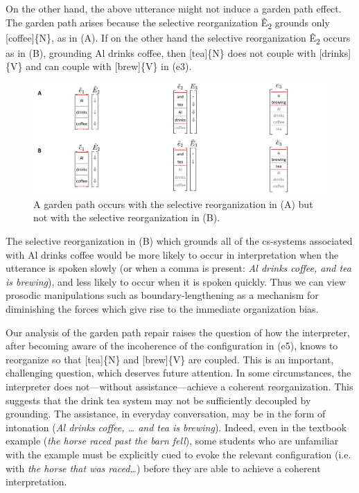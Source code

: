   On the other hand, the above utterance might not induce a garden path effect. The garden path arises because the selective reorganization Ê\textsubscript{2} grounds only [coffee]\{N\}, as in {}(A). If on the other hand the selective reorganization Ê\textsubscript{2} occurs as in (B), grounding {\textbar}Al drinks coffee{\textbar}, then [tea]\{N\} does not couple with [drinks]\{V\} and can couple with [brew]\{V\} in (e3).

  
\begin{figure}
\includegraphics[width=\textwidth]{figures/Tilsen-img131.png}
\caption{A garden path occurs with the selective reorganization in (A) but not with the selective reorganization in (B).}
\label{fig:6:12}
\end{figure}
 

  The selective reorganization in (B) which grounds all of the cs-systems associated with {\textbar}Al drinks coffee{\textbar} would be more likely to occur in interpretation when the utterance is spoken slowly (or when a comma is present: \textit{Al drinks coffee, and tea is brewing}), and less likely to occur when it is spoken quickly. Thus we can view prosodic manipulations such as boundary-lengthening as a mechanism for diminishing the forces which give rise to the immediate organization bias.

  Our analysis of the garden path repair raises the question of how the interpreter, after becoming aware of the incoherence of the configuration in (e5), knows to reorganize so that [tea]\{N\} and [brew]\{V\} are coupled. This is an important, challenging question, which deserves future attention. In some circumstances, the interpreter does not—without assistance—achieve a coherent reorganization. This suggests that the {\textbar}drink tea{\textbar} system may not be sufficiently decoupled by grounding. The assistance, in everyday conversation, may be in the form of intonation (\textit{Al drinks coffee, … and tea is brewing}). Indeed, even in the textbook example (\textit{the horse raced past the barn fell}), some students who are unfamiliar with the example must be explicitly cued to evoke the relevant configuration (i.e. with \textit{the horse that was raced…}) before they are able to achieve a coherent interpretation. 

